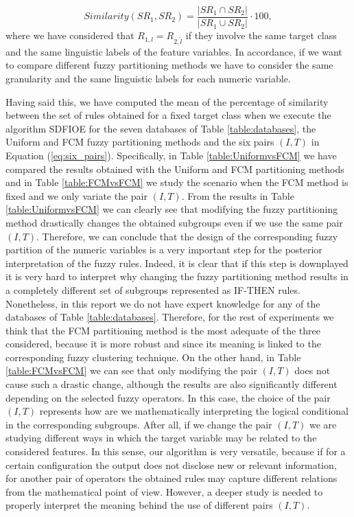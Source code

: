 $$ Similarity(SR_1,SR_2)=\frac{|SR_1 \cap SR_2|}{|SR_1 \cup SR_2|} \cdot 100,$$
where we have considered that $R_{1,l} = R_{2,\tilde{l}}$ if they involve the same target class and the same linguistic labels of the feature variables. In accordance, if we want to compare different fuzzy partitioning methods we have to consider the same granularity and the same linguistic labels for each numeric variable.

Having said this, we have computed the mean of the percentage of similarity between the set of rules obtained for a fixed target class when we execute the algorithm SDFIOE for the seven databases of Table \ref{table:databases}, the Uniform and FCM fuzzy partitioning methods and the six pairs $(I,T)$ in Equation (\ref{eq:six_pairs}). Specifically, in Table \ref{table:UniformvsFCM} we have compared the results obtained with the Uniform and FCM partitioning methods and in Table \ref{table:FCMvsFCM} we study the scenario when the FCM method is fixed and we only variate the pair $(I,T)$. From the results in Table \ref{table:UniformvsFCM} we can clearly see that modifying the fuzzy partitioning method drastically changes the obtained subgroups even if we use the same pair $(I,T)$. Therefore, we can conclude that the design of the corresponding fuzzy partition of the numeric variables is a very important step for the posterior interpretation of the fuzzy rules. Indeed, it is clear that if this step is downplayed it is very hard to interpret why changing the fuzzy partitioning method results in a completely different set of subgroups represented as IF-THEN rules. Nonetheless, in this report we do not have expert knowledge for any of the databases of Table \ref{table:databases}. Therefore, for the rest of experiments we think that the FCM partitioning method is the most adequate of the three considered, because it is more robust and since its meaning is linked to the corresponding fuzzy clustering technique. On the other hand, in Table \ref{table:FCMvsFCM} we can see that only modifying the pair $(I,T)$ does not cause such a drastic change, although the results are also significantly different depending on the selected fuzzy operators. In this case, the choice of the pair $(I,T)$ represents how are we mathematically interpreting the logical conditional in the corresponding subgroups. After all, if we change the pair $(I,T)$ we are studying different ways in which the target variable may be related to the considered features. In this sense, our algorithm is very versatile, because if for a certain configuration the output does not disclose new or relevant information, for another pair of operators the obtained rules may capture different relations from the mathematical point of view. However, a deeper study is needed to properly interpret the meaning behind the use of different pairs $(I,T)$.

